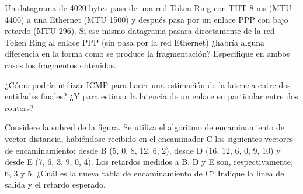 \begin{ejercicio}
    Un datagrama de 4020 bytes pasa de una red Token Ring con THT 8 ms (MTU 4400) a una Ethernet (MTU 1500) y después pasa por un enlace PPP con bajo retardo (MTU 296). Si ese mismo datagrama pasara directamente de la red Token Ring al enlace PPP (sin pasa por la red Ethernet) ¿habría alguna diferencia en la forma como se produce la fragmentación? Especifique en ambos casos los fragmentos obtenidos.
\end{ejercicio}

\begin{ejercicio}
    ¿Cómo podría utilizar ICMP para hacer una estimación de la latencia entre dos entidades finales? ¿Y para estimar la latencia de un enlace en particular entre dos routers?
\end{ejercicio}

\begin{ejercicio}
    Considere la subred de la figura. Se utiliza el algoritmo de encaminamiento de vector distancia, habiéndose recibido en el encaminador C los siguientes vectores de encaminamiento: desde B (5, 0, 8, 12, 6, 2), desde D (16, 12, 6, 0, 9, 10) y desde E (7, 6, 3, 9, 0, 4). Los retardos medidos a B, D y E son, respectivamente, 6, 3 y 5. ¿Cuál es la nueva tabla de encaminamiento de C\@? Indique la línea de salida y el retardo esperado.
\end{ejercicio}

